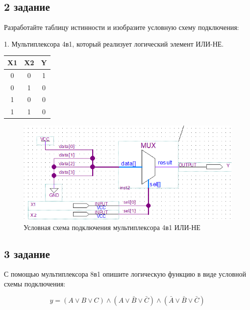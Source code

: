 \documentclass[a4paper,14pt]{article}
\begin{document}
\subsection{2 задание}

Разработайте таблицу истинности и изобразите условную схему
подключения:

1. Мультиплексора 4в1, который реализует логический элемент ИЛИ-НЕ.

\begin{table}[H]
	\begin{center}
		\begin{flushleft}
		\end{flushleft}
		\label{tab:ili_ne}
		\begin{tabular}{|c|c|c|}
			\hline
			X1 & X2 & Y \\ \hline
			0  & 0  & 1 \\ \hline
			0  & 1  & 0 \\ \hline
			1  & 0  & 0 \\ \hline
			1  & 1  & 0 \\ \hline
		\end{tabular}
	\end{center}
\end{table}

\begin{figure}[H]
	\centering
	\includegraphics[width=0.6\linewidth]{img/dop2_sh}
	\caption{Условная схема подключения мультиплексора 4в1 ИЛИ-НЕ}
	\label{fig:dop2_sh}
\end{figure}

\subsection{3 задание}

С помощью мультиплексора 8в1 опишите логическую функцию в виде
условной схемы подключения: 

\begin{equation}
y = (A \vee B \vee C) \wedge (A \vee \bar B \vee \bar C) \wedge ( \bar A \vee \bar B \vee \bar C)
\label{eq:zad}
\end{equation}
\end{document}
